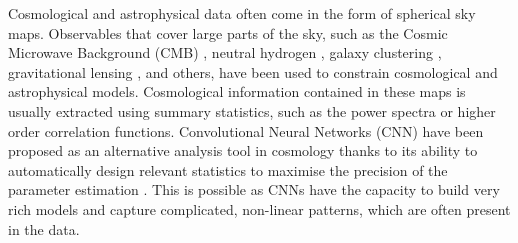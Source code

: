 \documentclass[final,twocolumn,3p,times,authoryear]{elsarticle}
\newcommand{\nati}[1]{{\color[rgb]{.1,.6,.1}{#1}}}
\newcommand{\TK}[1]{{\color{red}{TK:#1}}}
\newcommand{\todo}[1]{{\color[rgb]{.6,.1,.6}{#1}}}
\newcommand{\1}{\b{1}}              %
\newcommand{\0}{\b{0}}              %
\begin{document}
Cosmological and astrophysical data often come in the form of spherical sky maps.
Observables that cover large parts of the sky, such as the Cosmic Microwave Background (CMB) \citep{planck2015cosmologicalparameters,komatsu2011sevenyear,staggs2018recentdiscoveries}, neutral hydrogen \citep{santos2015cosmologySKA,HI4PI2016fullskyHI}, galaxy clustering \citep{alam2017clusteringgalaxies}, gravitational lensing \citep{troxel2017darkenergy,hildebrandt2017kidscosmological}, and others, have been used to constrain cosmological and astrophysical models.
Cosmological information contained in these maps is usually extracted using summary statistics, such as the power spectra or higher order correlation functions.
Convolutional Neural Networks (CNN) have been proposed as an alternative analysis tool in cosmology thanks to its ability to automatically design relevant statistics to maximise the precision of the parameter estimation
\citep{schmelze2017cosmologicalmodel,luciesmith2018machinelearning,gupta2018nongaussianinformation,gillet2018deeplearning,hassan2018reionizationmodels,aragoncalvo2018classyfyinglarge,ciuca2017cnnstring,ravanbakhsh2017estimating}.
This is possible as CNNs have the capacity to build very rich models and capture complicated, non-linear patterns, which are often present in the data.


\end{document}
